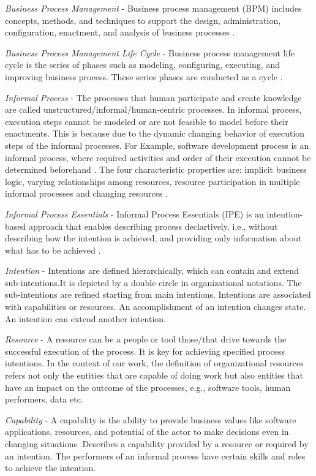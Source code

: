 \textit{Business Process Management} - Business process management (BPM) includes concepts, methods, and techniques to support the design, administration, configuration, enactment, and analysis of business processes \cite{Weske2012}.

\textit{Business Process Management Life Cycle} - Business process management life cycle is the series of phases such as modeling, configuring, executing, and improving business process. These series phases are conducted as a cycle \cite{Weske2012}.

\textit{Informal Process} - The processes that human participate and create knowledge are called unstructured/informal/human-centric processes. In informal process, execution steps cannot be modeled or are not feasible to model before their enactments. This is because due to the dynamic changing behavior of execution steps of the informal processes.  For Example, software development process is an informal process, where required activities and order of their execution cannot be determined beforehand \cite{Sungur2015}. The four characteristic properties are: implicit business logic, varying relationships among resources, resource participation in multiple informal processes and changing resources \cite{Sungur2014a}.    

\textit{Informal Process Essentials} - Informal Process Essentials (IPE) is an intention-based approach that enables describing process declartively, i.e., without describing how the intention is achieved, and providing only information about what has to be achieved \cite{Sungur2014a}. 
 
\textit{Intention} - Intentions are defined hierarchically, which can contain and extend sub-intentions.It is depicted by a double circle in organizational notations. The sub-intentions are refined starting from main intentions. Intentions are associated with capabilities or resources. An accomplishment of an intention changes state. An intention can extend another intention.        

\textit{Resource} - A resource can be a people or tool those/that drive towards the successful execution of the process. It is key for achieving specified process intentions. In the context of our work, the definition of organizational resources refers not only the entities that are capable of doing work but also entities that have an impact on the outcome of the processes, e.g., software tools, human performers, data etc.      

\textit{Capability} - A capability is the ability to provide business values like software applications, resources, and potential of the actor to make decisions even in changing situations \cite{Stirna2012}.Describes a capability provided by a resource or required by an intention. The performers of an informal process have certain skills and roles to achieve the intention.   

